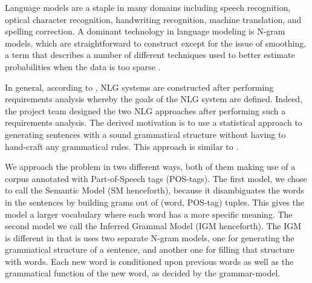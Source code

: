 \documentclass[ai15_group61_report.tex]{subfiles}
\begin{document}
Language models are a staple in many domains including speech recognition, optical character recognition, handwriting recognition, machine translation, and spelling correction. A dominant technology in language modeling is N-gram models, which are straightforward to construct except for the issue of smoothing, a term that describes a number of different techniques used to better estimate probabilities when the data is too sparse \cite{chen-smoothing}.

In general, according to \cite{Reiter:2000:BNL:331955}, NLG systems are constructed after performing requirements analysis whereby the goals of the NLG system are defined. Indeed, the project team designed the two NLG approaches after performing such a requirements analysis. The derived motivation is to use a statistical approach to generating sentences with a sound grammatical structure without having to hand-craft any grammatical rules. This approach is similar to \cite{Ratnaparkhi00}.

We approach the problem in two different ways, both of them making use of a corpus annotated with Part-of-Speech tags (POS-tags). The first model, we chose to call the Semantic Model (SM henceforth), because it disambiguates the words in the sentences by building grams out of (word, POS-tag) tuples. This gives the model a larger vocabulary where each word has a more specific meaning. The second model we call the Inferred Grammal Model (IGM henceforth). The IGM is different in that is uses two separate N-gram models, one for generating the grammatical structure of a sentence, and another one for filling that structure with words. Each new word is conditioned upon previous words as well as the grammatical function of the new word, as decided by the grammar-model.
\end{document}
